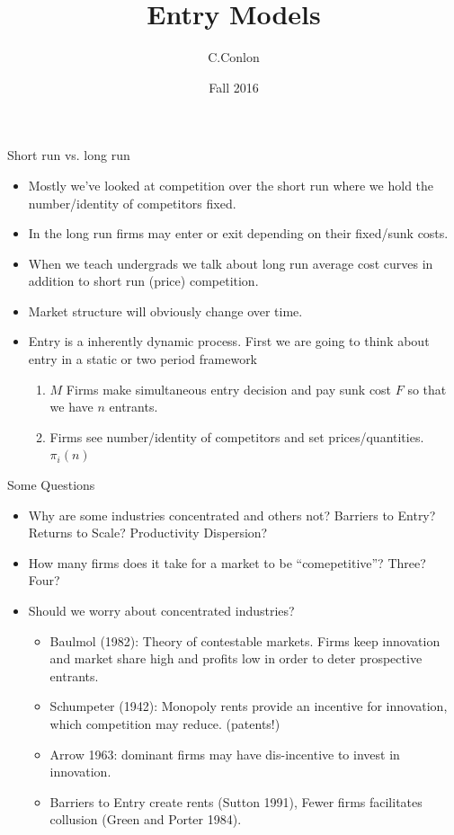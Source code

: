 \documentclass[aspectratio=169,11pt]{beamer}
\title []{Entry Models}
\author{C.Conlon }
\institute{Grad IO }
\date{Fall 2016}
\begin{document}
\begin{frame}
\titlepage
\end{frame}



\begin{frame}{Short run vs. long run}
\begin{itemize}
\item Mostly we've looked at competition over the \alert{short run} where we hold the number/identity of competitors fixed.
\item In the \alert{long run} firms may enter or exit depending on their fixed/sunk costs.
\item When we teach undergrads we talk about \alert{long run average cost curves} in addition to short run (price) competition.
\item Market structure will obviously change over time.
\item Entry is a inherently dynamic process. First we are going to think about entry in a static or two period framework
\begin{enumerate}
\item $M$ Firms make simultaneous entry decision and pay sunk cost $F$ so that we have $n$ entrants.
\item Firms see number/identity of competitors and set prices/quantities. $\pi_i(n)$
\end{enumerate}
\end{itemize}
\end{frame} 


\begin{frame}{Some Questions}
\begin{itemize}
\item Why are some industries concentrated and others not? Barriers to Entry? Returns to Scale? Productivity Dispersion?
\item How many firms does it take for a market to be ``comepetitive''? Three? Four?
\item Should we worry about concentrated industries?
\begin{itemize}
\item Baulmol (1982): Theory of \alert{contestable} markets. Firms keep innovation and market share high and profits low in order to deter prospective entrants.
\item Schumpeter (1942): Monopoly rents provide an incentive for \alert{innovation}, which competition may reduce. (patents!)
\item Arrow 1963: dominant firms may have dis-incentive to invest in innovation.
\item Barriers to Entry create rents (Sutton 1991), Fewer firms facilitates collusion (Green and Porter 1984).
\end{itemize}
\end{itemize}
\end{frame} 
\end{document}
